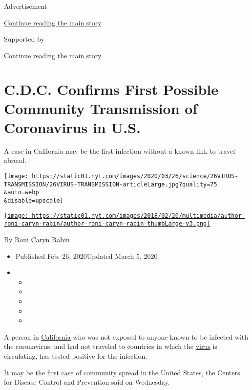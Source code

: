 Advertisement

\protect\hyperlink{after-top}{Continue reading the main story}

Supported by

\protect\hyperlink{after-sponsor}{Continue reading the main story}

\hypertarget{cdc-confirms-first-possible-community-transmission-of-coronavirus-in-us}{%
\section{C.D.C. Confirms First Possible Community Transmission of
Coronavirus in
U.S.}\label{cdc-confirms-first-possible-community-transmission-of-coronavirus-in-us}}

A case in California may be the first infection without a known link to
travel abroad.

\texttt{[image: https://static01.nyt.com/images/2020/03/26/science/26VIRUS-TRANSMISSION/26VIRUS-TRANSMISSION-articleLarge.jpg?quality=75\\\&auto=webp\\\&disable=upscale]}

\href{https://www.nytimes.com/by/roni-caryn-rabin}{\texttt{[image: https://static01.nyt.com/images/2018/02/20/multimedia/author-roni-caryn-rabin/author-roni-caryn-rabin-thumbLarge-v3.png]}}

By \href{https://www.nytimes.com/by/roni-caryn-rabin}{Roni Caryn Rabin}

\begin{itemize}
\item
  Published Feb. 26, 2020Updated March 5, 2020
\item
  \begin{itemize}
  \item
  \item
  \item
  \item
  \item
  \end{itemize}
\end{itemize}

A person in
\href{https://www.nytimes.com/2020/03/06/us/california-coronavirus-cruise-ship.html}{California}
who was not exposed to anyone known to be infected with the coronavirus,
and had not traveled to countries in which the
\href{https://www.nytimes.com/2020/03/06/us/california-coronavirus-cruise-ship.html}{virus}
is circulating, has tested positive for the infection.

It may be the first case of community spread in the United States, the
Centers for Disease Control and Prevention said on Wednesday.

